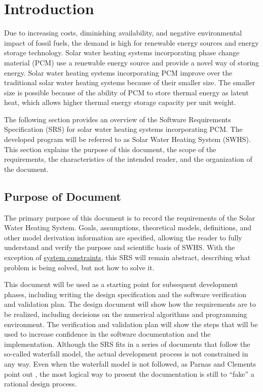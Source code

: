 \documentclass[12pt]{article}
\begin{document}
\section{Introduction}
\label{Sec:Intro}
Due to increasing costs, diminishing availability, and negative environmental impact of fossil fuels, the demand is high for renewable energy sources and energy storage technology. Solar water heating systems incorporating phase change material (PCM) use a renewable energy source and provide a novel way of storing energy. Solar water heating systems incorporating PCM improve over the traditional solar water heating systems because of their smaller size. The smaller size is possible because of the ability of PCM to store thermal energy as latent heat, which allows higher thermal energy storage capacity per unit weight.

The following section provides an overview of the Software Requirements Specification (SRS) for solar water heating systems incorporating PCM. The developed program will be referred to as Solar Water Heating System (SWHS). This section explains the purpose of this document, the scope of the requirements, the characteristics of the intended reader, and the organization of the document.

\subsection{Purpose of Document}
\label{Sec:DocPurpose}
The primary purpose of this document is to record the requirements of the Solar Water Heating System. Goals, assumptions, theoretical models, definitions, and other model derivation information are specified, allowing the reader to fully understand and verify the purpose and scientific basis of SWHS. With the exception of \hyperref[Sec:SysConstraints]{system constraints}, this SRS will remain abstract, describing what problem is being solved, but not how to solve it.

This document will be used as a starting point for subsequent development phases, including writing the design specification and the software verification and validation plan. The design document will show how the requirements are to be realized, including decisions on the numerical algorithms and programming environment. The verification and validation plan will show the steps that will be used to increase confidence in the software documentation and the implementation. Although the SRS fits in a series of documents that follow the so-called waterfall model, the actual development process is not constrained in any way. Even when the waterfall model is not followed, as Parnas and Clements point out \cite{parnasClements1986}, the most logical way to present the documentation is still to ``fake'' a rational design process.
\end{document}
